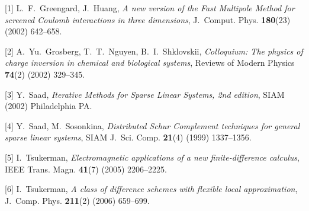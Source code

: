 \documentclass{report}
\begin{document}
[1]
L.~F.~Greengard, J.~Huang,
{\em A new version of the {Fast Multipole Method}
for screened {Coulomb} interactions in three
dimensions}, J.~Comput. Phys. {\bf 180}(23)
(2002) 642--658.

[2]
A.~Yu.~Grosberg, T.~T.~Nguyen, B.~I.~Shklovskii,
{\em Colloquium: The physics of charge inversion
in chemical and biological systems},
Reviews of Modern Physics {\bf 74}(2)
(2002) 329--345.

[3]
Y.~Saad, {\em Iterative Methods for Sparse Linear
Systems, 2nd edition}, SIAM (2002) Philadelphia PA.

[4]
Y.~Saad, M.~Sosonkina, {\em Distributed
{Schur Complement} techniques for general sparse
linear systems}, SIAM J.~Sci. Comp. {\bf 21}(4)
(1999) 1337--1356.

[5]
I.~Tsukerman, {\em Electromagnetic applications
of a new finite-difference calculus},
IEEE Trans. Magn. {\bf 41}(7) (2005) 2206--2225.

[6]
I.~Tsukerman, {\em A class of difference schemes with
flexible local approximation}, J.~Comp. Phys.
{\bf 211}(2) (2006) 659--699.



\end{document}
